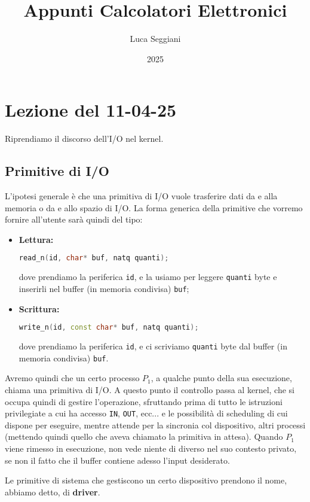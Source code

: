 \documentclass[a4paper,11pt]{article}
\title{Appunti Calcolatori Elettronici}
\author{Luca Seggiani}
\date{2025}
\begin{document}
\section{Lezione del 11-04-25}

\thispagestyle{empty}
\pagestyle{fancy}

Riprendiamo il discorso dell'I/O nel kernel.

\subsection{Primitive di I/O}
L'ipotesi generale è che una primitiva di I/O vuole trasferire dati da e alla memoria o da e allo spazio di I/O.
La forma generica della primitive che vorremo fornire all'utente sarà quindi del tipo:
\begin{itemize}
	\item \textbf{Lettura:}
\begin{lstlisting}[language=C++, style=codestyle]
read_n(id, char* buf, natq quanti);
\end{lstlisting}
dove prendiamo la periferica \lstinline|id|, e la usiamo per leggere \lstinline|quanti| byte e inserirli nel buffer (in memoria condivisa) \lstinline|buf|;
	\item \textbf{Scrittura:}
\begin{lstlisting}[language=C++, style=codestyle]
write_n(id, const char* buf, natq quanti);
\end{lstlisting}
dove prendiamo la periferica \lstinline|id|, e ci scriviamo \lstinline|quanti| byte dal buffer (in memoria condivisa) \lstinline|buf|.
\end{itemize}

Avremo quindi che un certo processo $P_1$, a qualche punto della sua esecuzione, chiama una primitiva di I/O.
A questo punto il controllo passa al kernel, che si occupa quindi di gestire l'operazione, sfruttando prima di tutto le istruzioni privilegiate a cui ha accesso \lstinline|IN|, \lstinline|OUT|, ecc... e le possibilità di scheduling di cui dispone per eseguire, mentre attende per la sincronia col dispositivo, altri processi (mettendo quindi quello che aveva chiamato la primitiva in attesa).
Quando $P_1$ viene rimesso in esecuzione, non vede niente di diverso nel suo contesto privato, se non il fatto che il buffer contiene adesso l'input desiderato.

\par\smallskip

Le primitive di sistema che gestiscono un certo dispositivo prendono il nome, abbiamo detto, di \textbf{driver}.
\end{document}
